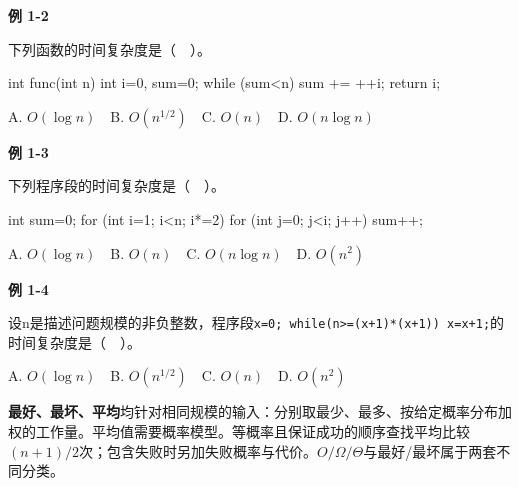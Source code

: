 \par\medskip{}\noindent\hypertarget{DS01-E02}{}\label{DS01-E02}\textbf{例 1-2}\par\nobreak\smallskip

下列函数的时间复杂度是（　）。

\par\smallskip\noindent\begin{minipage}{\linewidth}
\begin{codeblock}[language={C}]
int func(int n) {
    int i=0, sum=0;
    while (sum<n) sum += ++i;
    return i;
}
\end{codeblock}
\end{minipage}\par\smallskip

A. \(O(\log n)\)　B. \(O(n^{1/2})\)　C. \(O(n)\)　D. \(O(n\log n)\)

\par\medskip{}\noindent\hypertarget{DS01-E03}{}\label{DS01-E03}\textbf{例 1-3}\par\nobreak\smallskip

下列程序段的时间复杂度是（　）。

\par\smallskip\noindent\begin{minipage}{\linewidth}
\begin{codeblock}[language={C}]
int sum=0;
for (int i=1; i<n; i*=2)
    for (int j=0; j<i; j++)
        sum++;
\end{codeblock}
\end{minipage}\par\smallskip

A. \(O(\log n)\)　B. \(O(n)\)　C. \(O(n\log n)\)　D. \(O(n^2)\)

\par\medskip{}\noindent\hypertarget{DS01-E04}{}\label{DS01-E04}\textbf{例 1-4}\par\nobreak\smallskip

设n是描述问题规模的非负整数，程序段\texttt{x=\allowbreak{}0;\allowbreak{} while(\allowbreak{}n>\allowbreak{}=\allowbreak{}(\allowbreak{}x+\allowbreak{}1)\allowbreak{}*\allowbreak{}(\allowbreak{}x+\allowbreak{}1)\allowbreak{})\allowbreak{} x=\allowbreak{}x+\allowbreak{}1;\allowbreak{}}的时间复杂度是（　）。

A. \(O(\log n)\)　B. \(O(n^{1/2})\)　C. \(O(n)\)　D. \(O(n^2)\)

\textbf{最好、最坏、平均}均针对相同规模的输入：分别取最少、最多、按给定概率分布加权的工作量。平均值需要概率模型。等概率且保证成功的顺序查找平均比较\((n+1)/2\)次；包含失败时另加失败概率与代价。\(O/\Omega/\Theta\)与最好/最坏属于两套不同分类。

